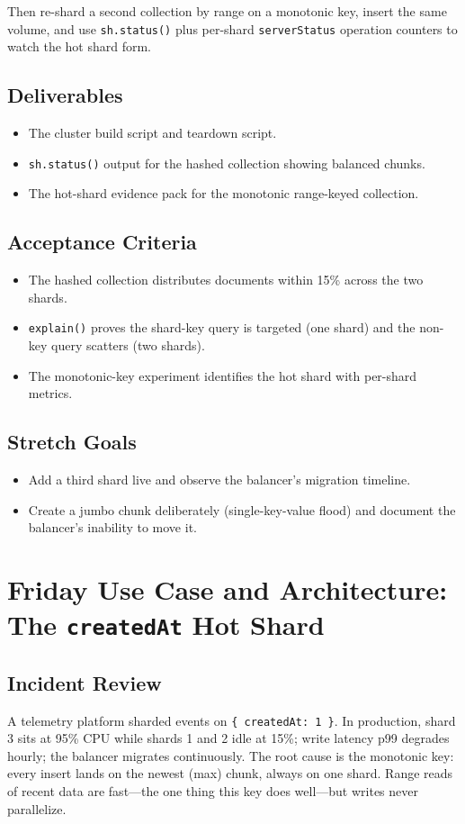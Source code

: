 Then re-shard a second collection by range on a monotonic key, insert the same volume, and use \texttt{sh.status()} plus per-shard \texttt{serverStatus} operation counters to watch the hot shard form.

\subsection*{Deliverables}
\begin{itemize}
    \item The cluster build script and teardown script.
    \item \texttt{sh.status()} output for the hashed collection showing balanced chunks.
    \item The hot-shard evidence pack for the monotonic range-keyed collection.
\end{itemize}

\subsection*{Acceptance Criteria}
\begin{itemize}
    \item The hashed collection distributes documents within 15\% across the two shards.
    \item \texttt{explain()} proves the shard-key query is targeted (one shard) and the non-key query scatters (two shards).
    \item The monotonic-key experiment identifies the hot shard with per-shard metrics.
\end{itemize}

\subsection*{Stretch Goals}
\begin{itemize}
    \item Add a third shard live and observe the balancer's migration timeline.
    \item Create a jumbo chunk deliberately (single-key-value flood) and document the balancer's inability to move it.
\end{itemize}

\section{Friday Use Case and Architecture: The \texttt{createdAt} Hot Shard}
\subsection{Incident Review}
A telemetry platform sharded events on \texttt{\{ createdAt: 1 \}}. In production, shard 3 sits at 95\% CPU while shards 1 and 2 idle at 15\%; write latency p99 degrades hourly; the balancer migrates continuously. The root cause is the monotonic key: every insert lands on the newest (max) chunk, always on one shard. Range reads of recent data are fast---the one thing this key does well---but writes never parallelize.

